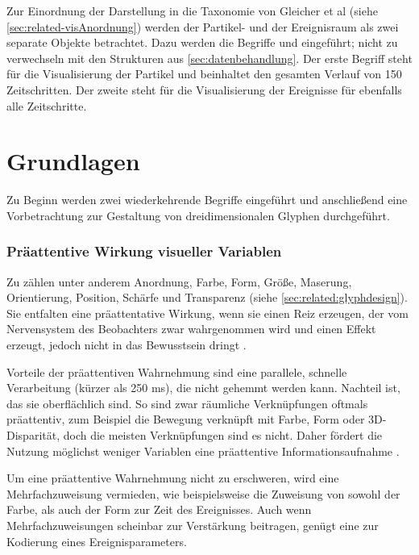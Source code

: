 Zur Einordnung der Darstellung in die Taxonomie von Gleicher et al (siehe \autoref{sec:related-visAnordnung}) werden der Partikel- und der Ereignisraum als zwei separate Objekte betrachtet. Dazu werden die Begriffe  und  eingeführt; nicht zu verwechseln mit den Strukturen aus \autoref{sec:datenbehandlung}. Der erste Begriff steht für die Visualisierung der Partikel und beinhaltet den gesamten Verlauf von 150 Zeitschritten. Der zweite steht für die Visualisierung der Ereignisse für ebenfalls alle Zeitschritte.  %


\section{Grundlagen}

Zu Beginn werden zwei wiederkehrende Begriffe eingeführt und anschließend eine Vorbetrachtung zur Gestaltung von dreidimensionalen Glyphen durchgeführt.

\subsubsection*{Präattentive Wirkung visueller Variablen}\label{sec:related-praattentiveWirkung}
Zu  zählen unter anderem Anordnung, Farbe, Form, Größe, Maserung, Orientierung, Position, Schärfe und Transparenz (siehe \autoref{sec:related:glyphdesign}). Sie entfalten eine präattentative Wirkung, wenn sie einen Reiz erzeugen, der vom Nervensystem des Beobachters zwar wahrgenommen wird und einen Effekt erzeugt, jedoch nicht in das Bewusstsein dringt \cite{funke2006kognition}.

Vorteile der präattentiven Wahrnehmung sind eine parallele, schnelle Verarbeitung (kürzer als 250 \gls{ms}), die nicht gehemmt werden kann. Nachteil ist, das sie oberflächlich sind. So sind zwar räumliche Verknüpfungen oftmals präattentiv, zum Beispiel die Bewegung verknüpft mit Farbe, Form oder 3D-Disparität, doch die meisten Verknüpfungen sind es nicht. Daher fördert die Nutzung möglichst weniger Variablen eine präattentive Informationsaufnahme \cite{healey2012attention}.

Um eine präattentive Wahrnehmung nicht zu erschweren, wird eine Mehrfachzuweisung vermieden, wie beispielsweise die Zuweisung von sowohl der Farbe, als auch der Form zur Zeit des Ereignisses. Auch wenn Mehrfachzuweisungen scheinbar zur Verstärkung beitragen, genügt eine  zur Kodierung eines Ereignisparameters.

